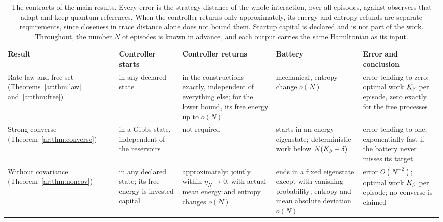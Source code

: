 \begin{table}[ht]
\centering
\small
\begin{tabular}{@{}>{\raggedright\arraybackslash}p{2.3cm}>{\raggedright\arraybackslash}p{2.4cm}>{\raggedright\arraybackslash}p{3.1cm}>{\raggedright\arraybackslash}p{3.1cm}>{\raggedright\arraybackslash}p{3.4cm}@{}}
\toprule
Result & Controller starts & Controller returns & Battery & Error and conclusion\\
\midrule
Rate law and free set (Theorems~\ref{ar:thm:law} and~\ref{ar:thm:free}) & in any declared state & in the constructions exactly, independent of everything else; for the lower bound, its free energy up to $o(N)$ & mechanical, entropy change $o(N)$ & error tending to zero; optimal work $K_\beta$ per episode, zero exactly for the free processes\\
Strong converse (Theorem~\ref{ar:thm:converse}) & in a Gibbs state, independent of the reservoirs & not required & starts in an energy eigenstate; deterministic work below $N(K_\beta-\delta)$ & error tending to one, exponentially fast if the battery never misses its target\\
Without covariance (Theorem~\ref{ar:thm:noncov}) & in any declared state; its free energy is invested capital & approximately: jointly within $\eta_N\to0$, with actual mean energy and entropy changes $o(N)$ & ends in a fixed eigenstate except with vanishing probability; entropy and mean absolute deviation $o(N)$ & error $O(N^{-2})$; optimal work $K_\beta$ per episode; no converse is claimed\\
\bottomrule
\end{tabular}
\caption{The contracts of the main results. Every error is the strategy distance of the whole interaction, over all episodes, against observers that adapt and keep quantum references. When the controller returns only approximately, its energy and entropy refunds are separate requirements, since closeness in trace distance alone does not bound them. Startup capital is declared and is not part of the work. Throughout, the number $N$ of episodes is known in advance, and each output carries the same Hamiltonian as its input.}\label{ar:tab:contract}
\end{table}

